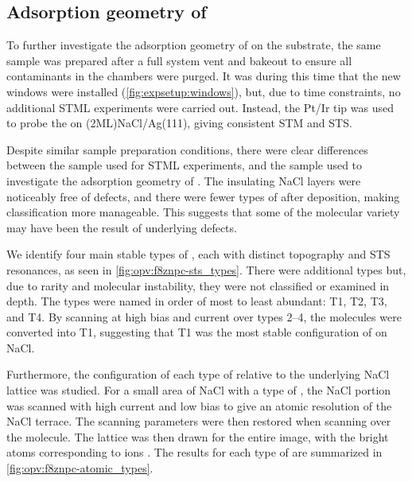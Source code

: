 \begin{figure} [h]
    \centering
    \caption{}
    \label{fig:opv:f8znpc-sts_stml}
\end{figure}



\subsection{Adsorption geometry of }

To further investigate the adsorption geometry of  on the substrate, the same sample was prepared after a full system vent and bakeout to ensure all contaminants in the chambers were purged. It was during this time that the new windows were installed (\autoref{fig:expsetup:windows}), but, due to time constraints, no additional \ac{STML} experiments were carried out. Instead, the Pt/Ir tip was used to probe the  on (2ML)NaCl/Ag(111), giving consistent \ac{STM} and \ac{STS}.

Despite similar sample preparation conditions, there were clear differences between the sample used for \ac{STML} experiments, and the sample used to investigate the adsorption geometry of . The insulating NaCl layers were noticeably free of defects, and there were fewer types of  after deposition, making classification more manageable. This suggests that some of the molecular variety may have been the result of underlying defects. 

\begin{figure} [h]
    \centering
    \caption{}
    \label{fig:opv:f8znpc-sts_types}
\end{figure}

We identify four main stable types of , each with distinct topography and \ac{STS} resonances, as seen in \autoref{fig:opv:f8znpc-sts_types}. There were additional types but, due to rarity and molecular instability, they were not classified or examined in depth. The types were named in order of most to least abundant: T1, T2, T3, and T4. By scanning at high bias and current over types 2--4, the molecules were converted into T1, suggesting that T1 was the most stable configuration of  on NaCl. 

Furthermore, the configuration of each type of  relative to the underlying NaCl lattice was studied. For a small area of NaCl with a type of , the NaCl portion was scanned with high current and low bias to give an atomic resolution of the NaCl terrace. The scanning parameters were then restored when scanning over the molecule. The lattice was then drawn for the entire image, with the bright atoms corresponding to  ions \citep{heidorn2013influence}. The results for each type of  are summarized in \autoref{fig:opv:f8znpc-atomic_types}.

